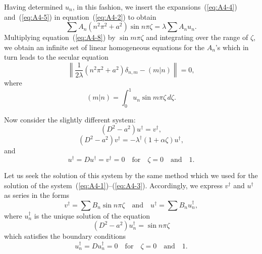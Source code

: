 Having determined $u_n$, in this fashion, we insert the expansions~(\ref{eq:A4-4})
and~(\ref{eq:A4-5}) in equation~(\ref{eq:A4-2}) to obtain
\begin{equation}
\label{eq:A4-8}
\sum A_n (n^2\pi^2 + a^2)\sin n\pi\zeta = \lambda \sum A_n u_n.
\end{equation}
Multiplying equation~(\ref{eq:A4-8}) by $\sin m\pi\zeta$ and integrating over the range of $\zeta$,
we obtain an infinite set of linear homogeneous equations for the $A_n$'s
which in turn leads to the secular equation
\begin{equation}
\label{eq:A4-9}
\left\| \frac{1}{2\lambda}(n^2\pi^2 + a^2)\delta_{n,m} - (m|n) \right\| = 0,
\end{equation}
where
\begin{equation}
\label{eq:A4-10}
(m|n) = \int_0^1 u_n \sin m\pi\zeta \, d\zeta.
\end{equation}

Now consider the slightly different system:
\begin{equation}
\label{eq:A4-11}
(D^2 - a^2)u^\dagger = v^\dagger,
\end{equation}
\begin{equation}
\label{eq:A4-12}
(D^2 - a^2)v^\dagger = -\lambda^\dagger (1 + \alpha\zeta)u^\dagger,
\end{equation}
and
\begin{equation}
\label{eq:A4-13}
u^\dagger = Du^\dagger = v^\dagger = 0 \quad \text{for} \quad \zeta = 0 \quad \text{and} \quad 1.
\end{equation}

Let us seek the solution of this system by the same method which we
used for the solution of the system~(\ref{eq:A4-1})--(\ref{eq:A4-3}). Accordingly, we express $v^\dagger$
and $u^\dagger$ as series in the forms
\begin{equation}
\label{eq:A4-14}
v^\dagger = \sum B_n \sin n\pi\zeta \quad \text{and} \quad u^\dagger = \sum B_n u_n^\dagger,
\end{equation}
where $u_n^\dagger$ is the unique solution of the equation
\begin{equation}
\label{eq:A4-15}
(D^2 - a^2)u_n^\dagger = \sin n\pi\zeta
\end{equation}
which satisfies the boundary conditions
\begin{equation}
\label{eq:A4-16}
u_n^\dagger = Du_n^\dagger = 0 \quad \text{for} \quad \zeta = 0 \quad \text{and} \quad 1.
\end{equation}

